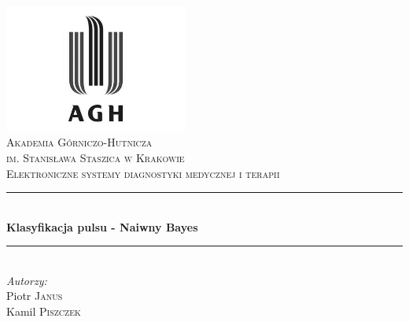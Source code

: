 \begin{titlepage}

\newcommand{\HRule}{\rule{\linewidth}{0.5mm}}

\center
 

\includegraphics[width=6cm]{./img/logo.png}\\[1cm]
 
 

\textsc{\LARGE Akademia Górniczo-Hutnicza \\[0.2cm]
im. Stanisława Staszica w Krakowie}\\[1.5cm]

\textsc{\Large Elektroniczne systemy diagnostyki medycznej i terapii}\\[0.5cm]


\HRule \\[0.5cm]
{ \huge \bfseries Klasyfikacja pulsu - Naiwny Bayes}\\[0.3cm]
\HRule \\[1.5cm]

\flushright
\Large \emph{Autorzy:}\\
Piotr \textsc{Janus}\\[0.1cm]  %
Kamil \textsc{Piszczek}\\[3cm]        %


\end{titlepage}
